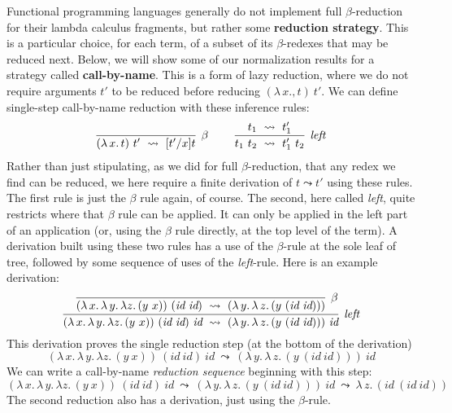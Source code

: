 \documentclass{article}
\begin{document}
Functional programming languages generally do not implement full
$\beta$-reduction for their lambda calculus fragments, but rather some
\textbf{reduction strategy}.  This is a particular choice, for each
term, of a subset of its $\beta$-redexes that may be reduced next.
Below, we will show some of our normalization results for a strategy
called \textbf{call-by-name}.  This is a form of lazy reduction, where
we do not require arguments $t'$ to be reduced before reducing
$(\lambda\,x., t)\ t'$.  We can define single-step call-by-name
reduction with these inference rules:
\[
\begin{array}{lll}
\infer[\beta]{(\lambda\,x.\, t)\ t'\ \leadsto\ [t'/x]t}
      {\ }
&\ &
\infer[\textit{left}]{t_1\ t_2\ \leadsto\ t_1'\ t_2}
      {t_1\ \leadsto\ t_1'}      
\end{array}
\]
\noindent Rather than just stipulating, as we did for full
$\beta$-reduction, that any redex we find can be reduced, we here
require a finite derivation of $t\leadsto t'$ using these rules.  The
first rule is just the $\beta$ rule again, of course.  The second,
here called \emph{left},
quite restricts where that $\beta$ rule can be applied.  It can only
be applied in the left part of an application (or, using the $\beta$
rule directly, at the top level of the term).  
A derivation built using these two rules has a use of the $\beta$-rule at the sole leaf of tree,
followed by some sequence of uses of the \emph{left}-rule.   Here is an example derivation:
\[
\infer[\textit{left}]
      {(\lambda\,x.\, \lambda\,y.\, \lambda z.\, (y\ x))\ (\textit{id}\ \textit{id}) \ \textit{id}\ \leadsto\ 
      (\lambda\,y.\, \lambda\,z.\, (y\ (\textit{id}\ \textit{id})))\ \textit{id}}
      {\infer[\beta]{(\lambda\,x.\, \lambda\,y.\, \lambda z.\, (y\ x))\ (\textit{id}\ \textit{id})\ \leadsto\
          (\lambda\,y.\, \lambda\,z.\, (y\ (\textit{id}\ \textit{id})))}{\ }}
      \]
\noindent This derivation proves the single reduction step (at the bottom of the derivation)
  \[
(\lambda\,x.\, \lambda\,y.\, \lambda z.\, (y\ x))\ (\textit{id}\ \textit{id}) \ \textit{id}\ \leadsto\ 
(\lambda\,y.\, \lambda\,z.\, (y\ (\textit{id}\ \textit{id})))\ \textit{id} 
\]
\noindent We can write a call-by-name \emph{reduction sequence} beginning with this step:
\[
(\lambda\,x.\, \lambda\,y.\, \lambda z.\, (y\ x))\ (\textit{id}\ \textit{id}) \ \textit{id}\ \leadsto\ 
(\lambda\,y.\, \lambda\,z.\, (y\ (\textit{id}\ \textit{id})))\ \textit{id}\ \leadsto\
\lambda\,z.\, (\textit{id}\ (\textit{id}\ \textit{id}))
\]
\noindent The second reduction also has a derivation, just using the $\beta$-rule.
\end{document}
